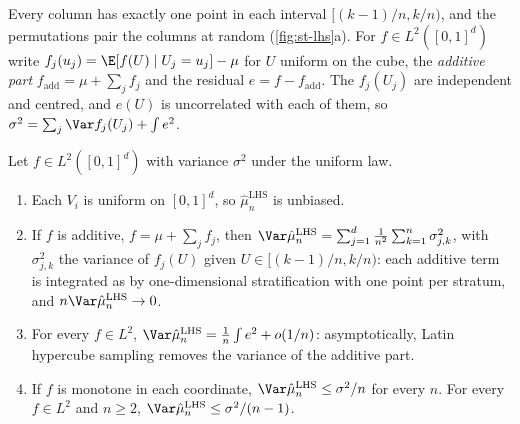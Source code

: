 Every column has exactly one point in each interval $[(k-1)/n,k/n)$, and the permutations
pair the columns at random (\cref{fig:st-lhs}a). For $f\in L^2([0,1]^d)$ write
$f_j(u_j)=\E[f(U)\mid U_j=u_j]-\mu$ for $U$ uniform on the cube, the \emph{additive part}
$f_{\mathrm{add}}=\mu+\sum_jf_j$ and the residual $e=f-f_{\mathrm{add}}$. The $f_j(U_j)$ are
independent and centred, and $e(U)$ is uncorrelated with each of them, so
$\sigma^2=\sum_j\Var f_j(U_j)+\int e^2$.

\begin{proposition}\label{prop:st-lhs}
Let $f\in L^2([0,1]^d)$ with variance $\sigma^2$ under the uniform law.
\begin{enumerate}[label=(\roman*)]
  \item Each $V_i$ is uniform on $[0,1]^d$, so $\hat\mu^{\mathrm{LHS}}_n$ is unbiased.
  \item If $f$ is additive, $f=\mu+\sum_jf_j$, then
    $\Var\hat\mu^{\mathrm{LHS}}_n=\sum_{j=1}^d\frac1{n^2}\sum_{k=1}^n\sigma_{j,k}^2$, with
    $\sigma_{j,k}^2$ the variance of $f_j(U)$ given $U\in[(k-1)/n,k/n)$: each additive term is
    integrated as by one-dimensional stratification with one point per stratum, and
    $n\Var\hat\mu^{\mathrm{LHS}}_n\to0$.
  \item \citep{stein-lhs} For every $f\in L^2$,
    $\Var\hat\mu^{\mathrm{LHS}}_n=\frac1n\int e^2+o(1/n)$: asymptotically, Latin hypercube
    sampling removes the variance of the additive part.
  \item \citep{mckay-beckman-conover} If $f$ is monotone in each coordinate,
    $\Var\hat\mu^{\mathrm{LHS}}_n\le\sigma^2/n$ for every $n$.
    \citep{owen-scrambled-nets} For every $f\in L^2$ and $n\ge2$,
    $\Var\hat\mu^{\mathrm{LHS}}_n\le\sigma^2/(n-1)$.
\end{enumerate}
\end{proposition}

